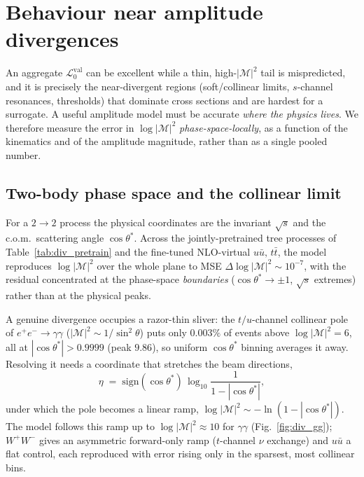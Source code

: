 \documentclass[11pt]{article}
\newcommand{\vlnr}{\mathcal{L}^{\mathrm{val}}_{0}}   %
\begin{document}
\section{Behaviour near amplitude divergences}\label{sec:divergences}

An aggregate $\vlnr$ can be excellent while a thin, high-$|\mathcal{M}|^2$ tail is
mispredicted, and it is precisely the near-divergent regions (soft/collinear limits,
$s$-channel resonances, thresholds) that dominate cross sections and are hardest for a
surrogate. A useful amplitude model must be accurate \emph{where the physics lives}. We
therefore measure the error in $\log|\mathcal{M}|^2$ \emph{phase-space-locally}, as a
function of the kinematics and of the amplitude magnitude, rather than as a single pooled
number.

\subsection{Two-body phase space and the collinear limit}

For a $2\to2$ process the physical coordinates are the invariant $\sqrt{s}$ and the
c.o.m.\ scattering angle $\cos\theta^*$. Across the jointly-pretrained tree processes of
Table~\ref{tab:div_pretrain} and the fine-tuned NLO-virtual $u\bar u,\,t\bar t$, the model
reproduces $\log|\mathcal{M}|^2$ over the whole plane to MSE
$\Delta\log|\mathcal{M}|^2\sim10^{-7}$, with the residual concentrated at the phase-space
\emph{boundaries} ($\cos\theta^*\to\pm1$, $\sqrt{s}$ extremes) rather than at the physical
peaks.

A genuine divergence occupies a razor-thin sliver: the $t/u$-channel collinear pole of
$e^+e^-\to\gamma\gamma$ ($|\mathcal{M}|^2\sim1/\sin^2\theta$) puts only $0.003\%$ of events
above $\log|\mathcal{M}|^2=6$, all at $|\cos\theta^*|>0.9999$ (peak $9.86$), so uniform
$\cos\theta^*$ binning averages it away. Resolving it needs a coordinate that stretches the
beam directions,
\begin{equation}
  \eta \;=\; \mathrm{sign}(\cos\theta^*)\,\log_{10}\frac{1}{1-|\cos\theta^*|},
  \label{eq:collinear}
\end{equation}
under which the pole becomes a linear ramp, $\log|\mathcal{M}|^2\sim-\ln(1-|\cos\theta^*|)$.
The model follows this ramp up to $\log|\mathcal{M}|^2\approx10$ for $\gamma\gamma$
(Fig.~\ref{fig:div_gg}); $W^+W^-$ gives an asymmetric forward-only ramp ($t$-channel $\nu$
exchange) and $u\bar u$ a flat control, each reproduced with error rising only in the
sparsest, most collinear bins.
\end{document}
